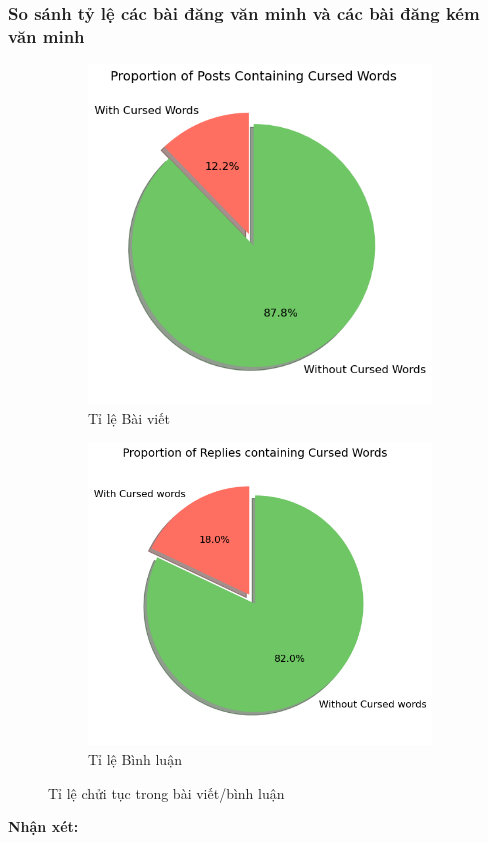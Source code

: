 \subsubsection{So sánh tỷ lệ các bài đăng văn minh và các bài đăng kém văn minh}
\vspace{-1em}
\begin{figure}[H]
  \begin{subfigure}{.47\textwidth}
  \centering
    \includegraphics[width=1\linewidth]{images/C2_pic42.png}
    \caption{Tỉ lệ Bài viết}
  \end{subfigure}
  \begin{subfigure}{.53\textwidth}
  \centering
    \includegraphics[width=1\linewidth]{images/C2_pic40.png}
    \caption{Tỉ lệ Bình luận}
  \end{subfigure}%
  \caption{Tỉ lệ chửi tục trong bài viết/bình luận}
  \label{fig:2.27}
\end{figure}
\vspace{-1em}
\textbf{Nhận xét:}

